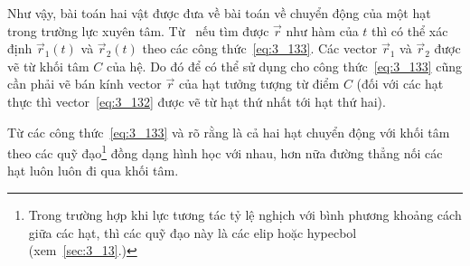 Như vậy, bài toán hai vật được đưa về bài toán về chuyển động của một hạt trong trường lực xuyên tâm. Từ~ nếu tìm được $\vec{r}$ như hàm của $t$ thì có thể xác định $\vec{r}_1(t)$ và $\vec{r}_2(t)$ theo các công thức~\eqref{eq:3_133}. Các vector $\vec{r}_1$ và $\vec{r}_2$ được vẽ từ khối tâm $C$ của hệ. Do đó để có thể sử dụng cho công thức~\eqref{eq:3_133} cũng cần phải vẽ bán kính vector $\vec{r}$ của hạt tưởng tượng từ điểm $C$ (đối với các hạt thực thì vector~\eqref{eq:3_132} được vẽ từ hạt thứ nhất tới hạt thứ hai).

Từ các công thức~\eqref{eq:3_133} và  rõ rằng là cả hai hạt chuyển động với khối tâm theo các quỹ đạo\footnote{Trong trường hợp khi lực tương tác tỷ lệ nghịch với bình phương khoảng cách giữa các hạt, thì các quỹ đạo này là các elip hoặc hypecbol (xem~\ref{sec:3_13}.)} đồng dạng hình học với nhau, hơn nữa đường thẳng nối các hạt luôn luôn đi qua khối tâm.

